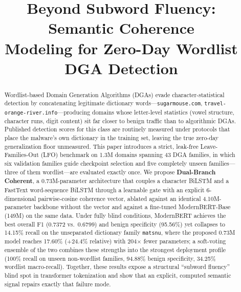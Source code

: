 \documentclass[conference]{IEEEtran}
\begin{document}
\title{Beyond Subword Fluency: Semantic Coherence\\ Modeling for Zero-Day Wordlist DGA Detection}

\author{
}

\maketitle

\begin{abstract}
Wordlist-based Domain Generation Algorithms (DGAs) evade character-statistical detection by concatenating legitimate dictionary words---\texttt{sugarmouse.com}, \texttt{travel-orange-river.info}---producing domains whose letter-level statistics (vowel structure, character runs, digit content) sit far closer to benign traffic than to algorithmic DGAs. Published detection scores for this class are routinely measured under protocols that place the malware's own dictionary in the training set, leaving the true zero-day generalization floor unmeasured. This paper introduces a strict, leak-free Leave-Families-Out (LFO) benchmark on 1.3M domains spanning 43 DGA families, in which six validation families guide checkpoint selection and five completely unseen families---three of them wordlist---are evaluated exactly once. We propose \textbf{Dual-Branch Coherent}, a 0.73M-parameter architecture that couples a character BiLSTM and a FastText word-sequence BiLSTM through a learnable gate with an explicit 6-dimensional pairwise-cosine coherence vector, ablated against an identical 4.10M-parameter backbone without the vector and against a fine-tuned ModernBERT-Base (149M) on the same data. Under fully blind conditions, ModernBERT achieves the best overall F1 (0.7372 vs.\ 0.6799) and benign specificity (95.56\%) yet collapses to 14.15\% recall on the unseparated dictionary family \texttt{matsnu}, where the proposed 0.73M model reaches 17.60\% (+24.4\% relative) with 204$\times$ fewer parameters; a soft-voting ensemble of the two combines these strengths into the strongest deployment profile (100\% recall on unseen non-wordlist families, 94.88\% benign specificity, 34.25\% wordlist macro-recall). Together, these results expose a structural ``subword fluency'' blind spot in transformer tokenization and show that an explicit, computed semantic signal repairs exactly that failure mode.
\end{abstract}
\end{document}
